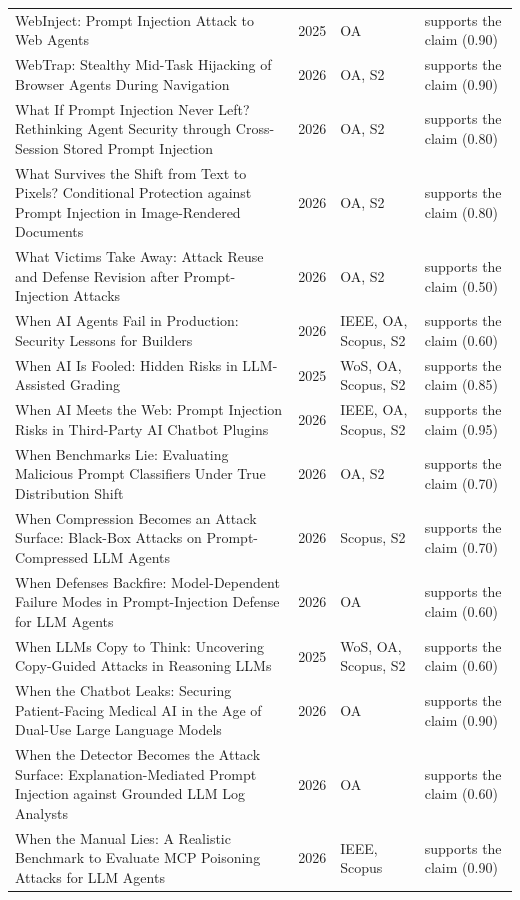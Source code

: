 \begin{longtable}{@{}%
  >{\raggedright\arraybackslash}p{}c%
  >{\raggedright\arraybackslash}p{}%
  >{\raggedright\arraybackslash}p{}@{}}
WebInject: Prompt Injection Attack to Web Agents & 2025 & OA & supports the claim (0.90) \\
WebTrap: Stealthy Mid-Task Hijacking of Browser Agents During Navigation & 2026 & OA, S2 & supports the claim (0.90) \\
What If Prompt Injection Never Left? Rethinking Agent Security through Cross-Session Stored Prompt Injection & 2026 & OA, S2 & supports the claim (0.80) \\
What Survives the Shift from Text to Pixels? Conditional Protection against Prompt Injection in Image-Rendered Documents & 2026 & OA, S2 & supports the claim (0.80) \\
What Victims Take Away: Attack Reuse and Defense Revision after Prompt-Injection Attacks & 2026 & OA, S2 & supports the claim (0.50) \\
When AI Agents Fail in Production: Security Lessons for Builders & 2026 & IEEE, OA, Scopus, S2 & supports the claim (0.60) \\
When AI Is Fooled: Hidden Risks in LLM-Assisted Grading & 2025 & WoS, OA, Scopus, S2 & supports the claim (0.85) \\
When AI Meets the Web: Prompt Injection Risks in Third-Party AI Chatbot Plugins & 2026 & IEEE, OA, Scopus, S2 & supports the claim (0.95) \\
When Benchmarks Lie: Evaluating Malicious Prompt Classifiers Under True Distribution Shift & 2026 & OA, S2 & supports the claim (0.70) \\
When Compression Becomes an Attack Surface: Black-Box Attacks on Prompt-Compressed LLM Agents & 2026 & Scopus, S2 & supports the claim (0.70) \\
When Defenses Backfire: Model-Dependent Failure Modes in Prompt-Injection Defense for LLM Agents & 2026 & OA & supports the claim (0.60) \\
When LLMs Copy to Think: Uncovering Copy-Guided Attacks in Reasoning LLMs & 2025 & WoS, OA, Scopus, S2 & supports the claim (0.60) \\
When the Chatbot Leaks: Securing Patient-Facing Medical AI in the Age of Dual-Use Large Language Models & 2026 & OA & supports the claim (0.90) \\
When the Detector Becomes the Attack Surface: Explanation-Mediated Prompt Injection against Grounded LLM Log Analysts & 2026 & OA & supports the claim (0.60) \\
When the Manual Lies: A Realistic Benchmark to Evaluate MCP Poisoning Attacks for LLM Agents & 2026 & IEEE, Scopus & supports the claim (0.90) \\

\end{longtable}
